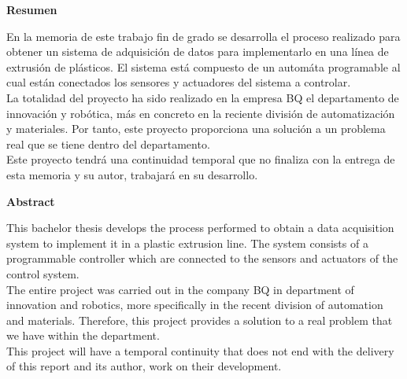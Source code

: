 
\thispagestyle{plain}
\begin{center}
    \Large
    \vspace{0.9cm}
    \textbf{Resumen}
\end{center}

En la memoria de este trabajo fin de grado se desarrolla el proceso realizado para obtener un sistema de adquisición de datos para implementarlo en una línea de extrusión de plásticos. El sistema está compuesto de un automáta programable al cual están conectados los sensores y actuadores del sistema a controlar.\\

La totalidad del proyecto ha sido realizado en la empresa BQ el departamento de innovación y robótica, más en concreto en la reciente división de automatización y materiales.  Por tanto, este proyecto proporciona una solución a un problema real que se tiene dentro del departamento.\\

Este proyecto tendrá una continuidad temporal que no finaliza con la entrega de esta memoria y su autor, trabajará en su desarrollo.\\
\newpage{}
\begin{center}
    \Large
    \vspace{0.9cm}
    \textbf{Abstract}
\end{center}


This bachelor thesis develops the process performed to obtain a data acquisition system to implement it in a plastic extrusion line. The system consists of a programmable controller which are connected to the sensors and actuators of the control system. \\

The entire project was carried out in the company BQ in department of innovation and robotics, more specifically in the recent division of automation and materials. Therefore, this project provides a solution to a real problem that we have within the department. \\

This project will have a temporal continuity that does not end with the delivery of this report and its author, work on their development. \\
